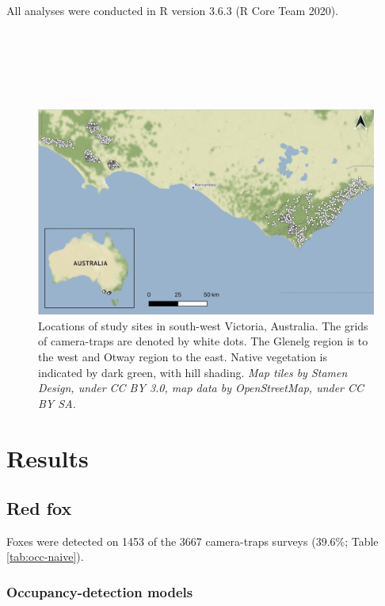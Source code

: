 \documentclass[11pt,a4paper,titlepage,twoside,openright]{style/unimelbthesis}
\begin{document}
\begin{mainmatter}
All analyses were conducted in R version 3.6.3 (R Core Team 2020).

\newpage

\(~\)

\(~\)

\(~\)
\begin{figure}

{\centering \includegraphics[width=1\linewidth]{figure/map_cams} 

}

\caption{Locations of study sites in south-west Victoria, Australia. The grids of camera-traps are denoted by white dots. The Glenelg region is to the west and Otway region to the east. Native vegetation is indicated by dark green, with hill shading. \textit{Map tiles by Stamen Design, under CC BY 3.0, map data by OpenStreetMap, under CC BY SA.}}\label{fig:occ-map}
\end{figure}
\newpage

\hypertarget{results-1}{%
\section{Results}\label{results-1}}

\hypertarget{red-fox-1}{%
\subsection{Red fox}\label{red-fox-1}}

Foxes were detected on 1453 of the 3667 camera-traps surveys (39.6\%; Table \ref{tab:occ-naive}).

\hypertarget{occupancy-detection-models-1}{%
\subsubsection{Occupancy-detection models}\label{occupancy-detection-models-1}}


\end{mainmatter}
\end{document}
